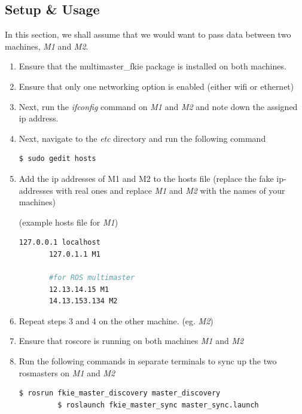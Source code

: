 \documentclass[11pt]{article}
\begin{document}
\subsection{Setup \& Usage}

In this section, we shall assume that we would want to pass data between two machines, \emph{M1} and \emph{M2}.

\begin{enumerate}
 \item {
       Ensure that the multimaster\_fkie package is installed on both machines.
       }
 \item {
       Ensure that only one networking option is enabled (either wifi or ethernet)
       }
 \item{
       Next, run the \emph{ifconfig} command on \emph{M1} and \emph{M2} and note down the  assigned ip address.
       }
 \item{
       Next, navigate to the \emph{etc} directory and run the following command
       \begin{lstlisting}[language=bash]
        $ sudo gedit hosts
        \end{lstlisting}
       }
 \item{
       Add the ip addresses of M1 and M2 to the hosts file (replace the fake ip-addresses with real ones and replace \emph{M1} and \emph{M2} with the names of your machines)
       
       (example hosts file for \emph{M1})
       \begin{lstlisting}[language=bash]
       127.0.0.1 localhost
       127.0.1.1 M1

       #for ROS multimaster
       12.13.14.15 M1
       14.13.153.134 M2
        \end{lstlisting}
       }
 \item{
       Repeat steps 3 and 4 on  the other machine. (eg. \emph{M2})
       }
 \item{
       Ensure that roscore is running on both machines \emph{M1} and \emph{M2}
       }
 \item{
       Run the following commands in separate terminals to sync up the two rosmasters on \emph{M1} and \emph{M2}
       \begin{lstlisting}[language=bash]
         $ rosrun fkie_master_discovery master_discovery
         $ roslaunch fkie_master_sync master_sync.launch
        \end{lstlisting}
       
       }
\end{enumerate}
\end{document}
